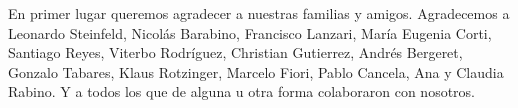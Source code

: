 
\begin{acknowledgments}

En primer lugar queremos agradecer a nuestras familias y amigos. Agradecemos a Leonardo Steinfeld, Nicolás Barabino, Francisco Lanzari, María Eugenia Corti, Santiago Reyes, Viterbo Rodríguez, Christian Gutierrez, Andrés Bergeret, Gonzalo Tabares, Klaus Rotzinger, Marcelo Fiori, Pablo Cancela, Ana y Claudia Rabino. Y a todos los que de alguna u otra forma colaboraron con nosotros.

\end{acknowledgments}